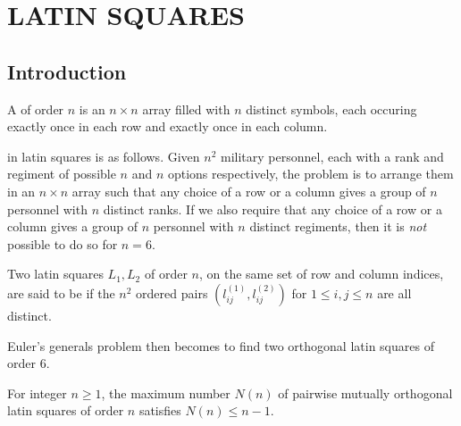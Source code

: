 \chapter{LATIN SQUARES}

\section{Introduction}

\begin{definition}
    A  of order $n$ is an $n \times n$ array filled with $n$ distinct symbols, each occuring exactly once in each row and exactly once in each column.
\end{definition}

 in latin squares is as follows. Given $n^{2}$ military personnel, each with a rank and regiment of possible $n$ and $n$ options respectively, the problem is to arrange them in an $n \times n$ array such that any choice of a row or a column gives a group of $n$ personnel with $n$ distinct ranks. If we also require that any choice of a row or a column gives a group of $n$ personnel with $n$ distinct regiments, then it is \textit{not} possible to do so for $n = 6$.

\begin{definition}
    Two latin squares $L_{1},L_{2}$ of order $n$, on the same set of row and column indices, are said to be  if the $n^{2}$ ordered pairs $(l_{ij}^{(1)},l_{ij}^{(2)})$ for $1 \leq i,j \leq n$ are all distinct.
\end{definition}

Euler's generals problem then becomes to find two orthogonal latin squares of order $6$.

\begin{theorem}
    For integer $n \geq 1$, the maximum number $N(n)$ of pairwise mutually orthogonal latin squares of order $n$ satisfies $N(n) \leq n-1$.
\end{theorem}

